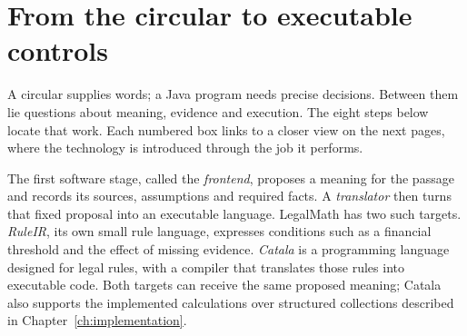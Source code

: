 \chapter*{From the circular to executable controls}
\label{map:overview}
\begingroup
{}
\newcommand{\MapSubheading}[1]{\par\vspace{2mm}{\sffamily\bfseries\large #1\par}\vspace{1mm}}
\newcommand{\MapHeading}[2]{\phantomsection\label{#2}\MapSubheading{#1}}
\newenvironment{MapDiagram}{\par\noindent\begin{minipage}{\linewidth}\centering}{\par\end{minipage}\par}
\newcommand{\MapCaption}[1]{\par{\small\itshape #1\par}\vspace{2mm}}

A circular supplies words; a Java program needs precise decisions. Between
them lie questions about meaning, evidence and execution. The eight steps
below locate that work. Each numbered box links to a closer view on the next
pages, where the technology is introduced through the job it performs.

The first software stage, called the \emph{frontend}, proposes a meaning for the
passage and records its sources, assumptions and required facts. A
\emph{translator} then turns that fixed proposal into an executable language.
LegalMath has two such targets. \emph{RuleIR}, its own small rule language,
expresses conditions such as a financial threshold and the effect of missing
evidence. \emph{Catala} is a programming language designed for legal rules,
with a compiler that translates those rules into executable code. Both targets
can receive the same proposed meaning; Catala also supports the implemented
calculations over structured collections described in Chapter~\ref{ch:implementation}.

